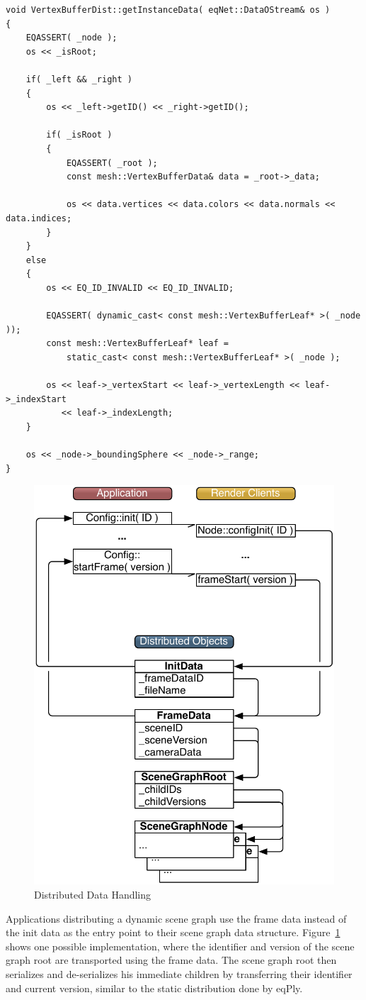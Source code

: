 \documentclass[10pt,a4]{scrartcl}
\newcommand{\fig}[1]{Figure~\ref{#1}}
\begin{document}
{\footnotesize\begin{lstlisting}
void VertexBufferDist::getInstanceData( eqNet::DataOStream& os )
{
    EQASSERT( _node );
    os << _isRoot;

    if( _left && _right )
    {
        os << _left->getID() << _right->getID();

        if( _isRoot )
        {
            EQASSERT( _root );
            const mesh::VertexBufferData& data = _root->_data;
            
            os << data.vertices << data.colors << data.normals << data.indices;
        }
    }
    else
    {
        os << EQ_ID_INVALID << EQ_ID_INVALID;

        EQASSERT( dynamic_cast< const mesh::VertexBufferLeaf* >( _node ));
        const mesh::VertexBufferLeaf* leaf = 
            static_cast< const mesh::VertexBufferLeaf* >( _node );

        os << leaf->_vertexStart << leaf->_vertexLength << leaf->_indexStart
           << leaf->_indexLength;
    }

    os << _node->_boundingSphere << _node->_range;
}
\end{lstlisting}}%

\begin{figure}
  \includegraphics[width=.382\textwidth]{images/objects.pdf}
  {\caption{\small\label{fObjects}Distributed Data Handling}}
\end{figure}
Applications distributing a dynamic scene graph use the frame data
instead of the init data as the entry point to their scene graph data
structure. \fig{fObjects} shows one possible implementation, where the
identifier and version of the scene graph root are transported using the
frame data. The scene graph root then serializes and de-serializes his
immediate children by transferring their identifier and current version,
similar to the static distribution done by \textsf{eqPly}.
\end{document}
